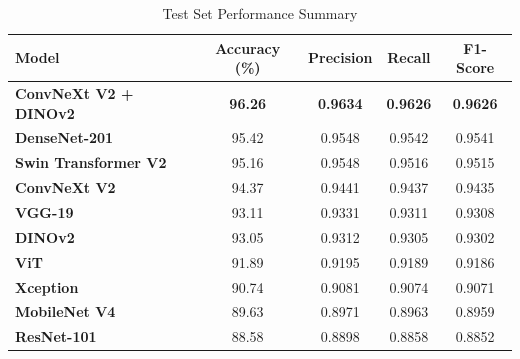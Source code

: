 \begin{table}[H]
\centering
\caption{Test Set Performance Summary}
\label{tab:test_summary}
\begin{tabular}{lcccc}
\toprule
\textbf{Model} & \textbf{Accuracy (\%)} & \textbf{Precision} & \textbf{Recall} & \textbf{F1-Score} \\
\midrule
\textbf{ConvNeXt V2 + DINOv2} & \textbf{96.26} & \textbf{0.9634} & \textbf{0.9626} & \textbf{0.9626} \\
\textbf{DenseNet-201}          & 95.42          & 0.9548          & 0.9542          & 0.9541          \\
\textbf{Swin Transformer V2}   & 95.16          & 0.9548          & 0.9516          & 0.9515          \\
\textbf{ConvNeXt V2}           & 94.37          & 0.9441          & 0.9437          & 0.9435          \\
\textbf{VGG-19}                & 93.11          & 0.9331          & 0.9311          & 0.9308          \\
\textbf{DINOv2}                & 93.05          & 0.9312          & 0.9305          & 0.9302          \\
\textbf{ViT}                   & 91.89          & 0.9195          & 0.9189          & 0.9186          \\
\textbf{Xception}              & 90.74          & 0.9081          & 0.9074          & 0.9071          \\
\textbf{MobileNet V4}          & 89.63          & 0.8971          & 0.8963          & 0.8959          \\
\textbf{ResNet-101}            & 88.58          & 0.8898          & 0.8858          & 0.8852          \\
\bottomrule
\end{tabular}
\end{table}
